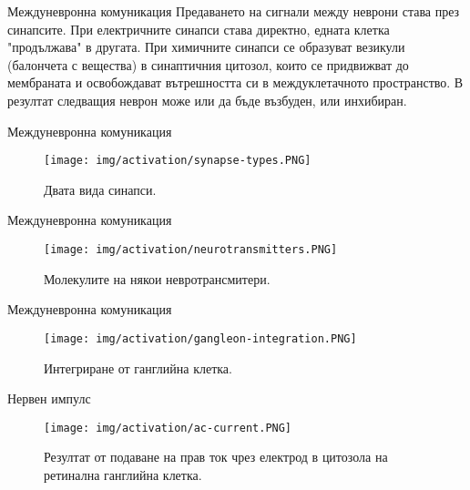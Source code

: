 \begin{frame}[t]{Междуневронна комуникация}
  Предаването на сигнали между неврони става през синапсите.
  При електричните синапси става директно, едната клетка "продължава" в другата.
  При химичните синапси се образуват везикули (балончета с вещества) в синаптичния цитозол,
  които се придвижват до мембраната и освобождават вътрешността си в междуклетачното пространство.
  В резултат следващия неврон може или да бъде възбуден, или инхибиран.
\end{frame}

\begin{frame}[t]{Междуневронна комуникация}
  \begin{figure}[htbp!]
    \centering
    \texttt{[image: img/activation/synapse-types.PNG]}
    \caption{Двата вида синапси. \cite[Фиг 5.1]{Neuroscience}}
  \end{figure}
\end{frame}

\begin{frame}[t]{Междуневронна комуникация}
  \begin{figure}[htbp!]
    \centering
    \texttt{[image: img/activation/neurotransmitters.PNG]}
    \caption{Молекулите на някои невротрансмитери. \cite[Фиг 6.1]{Neuroscience}}
  \end{figure}
\end{frame}

\begin{frame}[t]{Междуневронна комуникация}
  \begin{figure}[htbp!]
    \centering
    \texttt{[image: img/activation/gangleon-integration.PNG]}
    \caption{Интегриране от ганглийна клетка. \cite[Фиг 1.16]{Neuron}}
  \end{figure}
\end{frame}

\begin{frame}[t]{Нервен импулс}
  \begin{figure}[htbp!]
    \centering
    \texttt{[image: img/activation/ac-current.PNG]}
    \caption{Резултат от подаване на прав ток чрез електрод в цитозола на ретинална ганглийна клетка. \cite[Фиг 1.12]{Neuron}}
  \end{figure}
\end{frame}

